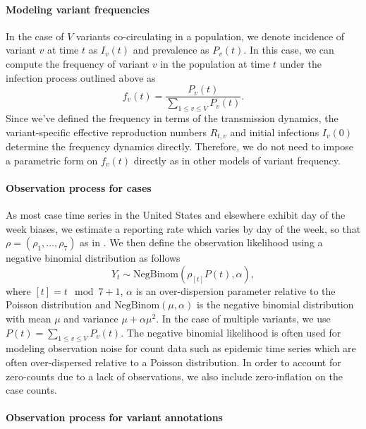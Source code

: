 \documentclass[11pt,oneside,letterpaper]{article}
\begin{document}
\paragraph{Modeling variant frequencies}%

In the case of $V$ variants co-circulating in a population, we denote incidence of variant $v$ at time $t$ as $I_{v}(t)$ and prevalence as $P_{v}(t)$.
In this case, we can compute the frequency of variant $v$ in the population at time $t$ under the infection process outlined above as
\begin{equation}
  f_{v}(t) = \frac{P_{v}(t)}{ \sum_{1\leq v \leq V} P_{v}(t)}.
\end{equation}
Since we've defined the frequency in terms of the transmission dynamics, the variant-specific effective reproduction numbers $R_{t,v}$ and initial infections $I_{v}(0)$ determine the frequency dynamics directly.
Therefore, we do not need to impose a parametric form on $f_{v}(t)$ directly as in other models of variant frequency.

\paragraph{Observation process for cases}%

As most case time series in the United States and elsewhere exhibit day of the week biases, we estimate a reporting rate which varies by day of the week, so that $\rho = (\rho_{1}, \ldots, \rho_{7})$ as in \cite{Abbott2020}.
We then define the observation likelihood using a negative binomial distribution as follows
\begin{equation}
  Y_{t} \sim \text{NegBinom}(\rho_{[t]} P(t),  \alpha),
\end{equation}
where $[t] = t \mod 7 + 1$, $\alpha$ is an over-dispersion parameter relative to the Poisson distribution and $\text{NegBinom}(\mu, \alpha)$ is the negative binomial distribution with mean $\mu$ and variance  $\mu + \alpha\mu^{2}$. In the case of multiple variants, we use $P(t) = \sum_{1\leq v \leq V} P_{v}(t)$.
The negative binomial likelihood is often used for modeling observation noise for count data such as epidemic time series which are often over-dispersed relative to a Poisson distribution.
In order to account for zero-counts due to a lack of observations, we also include zero-inflation on the case counts.

\paragraph{Observation process for variant annotations}%
\end{document}
